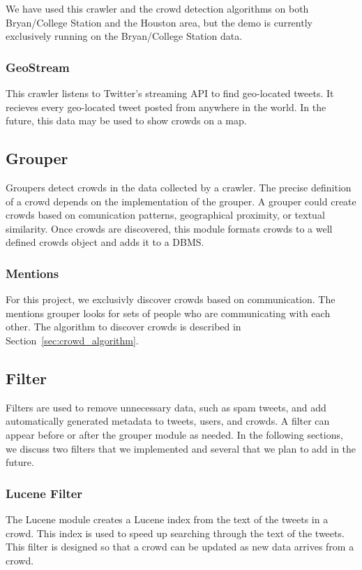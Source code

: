 \documentclass{sig-alternate}
\begin{document}
We have used this crawler and the crowd detection algorithms on both Bryan/College
Station and the Houston area, but the demo is currently exclusively running on the
Bryan/College Station data.

\subsubsection{GeoStream}
This crawler listens to Twitter's
streaming API to find geo-located tweets.  It recieves every geo-located tweet
posted from anywhere in the world.  In the future, this data may be used to
show crowds on a map.

\subsection{Grouper}
Groupers detect crowds in the data collected by a crawler.  The precise
definition of a crowd depends on the implementation of the grouper.  A grouper
could create crowds based on comunication patterns, geographical proximity, or
textual similarity. Once crowds are discovered, this module formats crowds to a
well defined crowds object and adds it to a DBMS.

\subsubsection{Mentions}
For this project, we exclusivly discover crowds based on communication.  The
mentions grouper looks for sets of people who are communicating with each
other.  The algorithm to discover crowds is described in
Section~\ref{sec:crowd_algorithm}.

\subsection{Filter}
Filters are used to remove unnecessary data, such as spam tweets, and add
automatically generated metadata to tweets, users, and crowds.  A filter can
appear before or after the grouper module as needed.  In the following
sections, we discuss two filters that we implemented and several that we plan
to add in the future.

\subsubsection{Lucene Filter}
The Lucene module creates a Lucene index from the text of the tweets in a
crowd.  This index is used to speed up searching through the text of the
tweets. This filter is designed so that a crowd can be updated as new data
arrives from a crowd.
\end{document}
